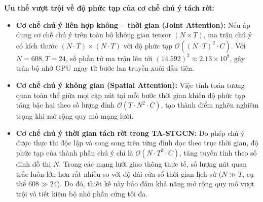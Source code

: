 \textbf{Ưu thế vượt trội về độ phức tạp của cơ chế chú ý tách rời:}
\begin{itemize}
    \item \textbf{Cơ chế chú ý liên hợp không -- thời gian (Joint Attention):} Nếu áp dụng cơ chế chú ý trên toàn bộ không gian tensor $(N \times T)$, ma trận chú ý có kích thước $(N \cdot T) \times (N \cdot T)$ với độ phức tạp $\mathcal{O}((N \cdot T)^2 \cdot C)$. Với $N = 608, T = 24$, số phần tử ma trận lên tới $(14.592)^2 \approx 2.13 \times 10^8$, gây tràn bộ nhớ GPU ngay từ bước lan truyền xuôi đầu tiên.
    \item \textbf{Cơ chế chú ý không gian (Spatial Attention):} Việc tính toán tương quan toàn thể giữa mọi cặp nút tại mỗi bước thời gian khiến độ phức tạp tăng bậc hai theo số lượng đỉnh $\mathcal{O}(T \cdot N^2 \cdot C)$, tạo thành điểm nghẽn nghiêm trọng khi mở rộng quy mô mạng lưới.
    \item \textbf{Cơ chế chú ý thời gian tách rời trong TA-STGCN:} Do phép chú ý được thực thi độc lập và song song trên từng đỉnh dọc theo trục thời gian, độ phức tạp của thành phần chú ý chỉ là $\mathcal{O}(N \cdot T^2 \cdot C)$, tăng tuyến tính theo số đỉnh đồ thị $N$. Trong các mạng lưới giao thông thực tế, số lượng nút quan trắc luôn lớn hơn rất nhiều so với độ dài cửa sổ thời gian lịch sử ($N \gg T$, cụ thể $608 \gg 24$). Do đó, thiết kế này bảo đảm khả năng mở rộng quy mô vượt trội và tiết kiệm bộ nhớ phần cứng tối đa.
\end{itemize}
